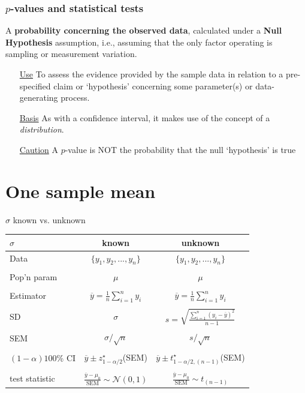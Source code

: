 \documentclass{beamer}\usepackage[]{graphicx}\usepackage[]{color}
\begin{document}
\begin{frame}
\frametitle{$p$-values and statistical tests}


\begin{defm}[$p$-value]
	A \textbf{probability concerning the observed data}, calculated under a \textbf{Null Hypothesis} assumption, i.e., assuming that the only factor operating is sampling or measurement variation. 
\end{defm}

\begin{itemize} 
	\item[\underline{Use}] To assess the evidence provided by the sample data
	in relation to a pre-specified claim or `hypothesis' concerning some parameter(s) or data-generating process. 
	\item[\underline{Basis}] As with a confidence interval, it makes use of the concept of a \textit{distribution}. 
	\item[\underline{Caution}] A $p$-value is NOT the probability that the null `hypothesis' is true
\end{itemize}
\end{frame}


\section{One sample mean}


\begin{frame}{$\sigma$ known vs. unknown}
\begin{center}
	\begin{tabular}{|l|c|c|} \hline
		$\sigma$& known & unknown \\ \hline Data & $\{y_1,y_2,...,y_n\}$ &
		$\{y_1,y_2,...,y_n\}$\\
		& & \\
		Pop'n param & $\mu$ & $\mu$\\
		& & \\
		Estimator & $\overline{y} = \frac{1}{n}\sum_{i=1}^n y_i$ & $\overline{y} = \frac{1}{n}\sum_{i=1}^n y_i$ \\
		& & \\
		SD & $\sigma$ & $s = \sqrt{\frac{\sum_{i=1}^n(y_i-\overline{y})^2}{n-1}}$ \\
		& & \\
		SEM & $\sigma/\sqrt{n}$ & $s / \sqrt{n}$ \\
		& & \\
		$(1-\alpha)100$\% CI & $\overline{y} \pm z^\star_{1-\alpha/2}$(SEM) & $\overline{y} \pm t^\star_{1-\alpha/2, (n-1)}$(SEM) \\
		& & \\
		test statistic & $\frac{\overline{y}-\mu_0}{\textrm{SEM}}\sim \mathcal{N}(0,1)$ &
		$\frac{\overline{y}-\mu_0}{\textrm{SEM}}\sim t_{(n-1)}$ \\
		\hline
	\end{tabular}
\end{center}
\end{frame}
\end{document}
